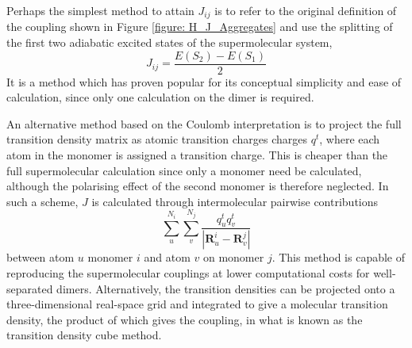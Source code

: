 Perhaps the simplest method to attain $J_{ij}$ is to refer to the original definition of the coupling shown in Figure \ref{figure: H_J_Aggregates} and use the splitting of the first two adiabatic excited states of the supermolecular system,
\begin{equation}
    J_{ij}=\frac{E(S_{2})-E(S_{1})}{2}
\end{equation}
It is a method which has proven popular for its conceptual simplicity and ease of calculation, since only one calculation on the dimer is required.\cite{Hsu2009,Gierschner2013a,Shi2017}

An alternative method based on the Coulomb interpretation is to project the full transition density matrix as atomic transition charges charges $q^{t}$, where each atom in the monomer is assigned a transition charge. This is cheaper than the full supermolecular calculation since only a monomer need be calculated, although the polarising effect of the second monomer is therefore neglected. In such a scheme, $J$ is calculated through intermolecular pairwise contributions
\begin{equation}\label{equation: J_TC}
\sum_{u}^{N_{i}}\sum_{v}^{N_{j}}\frac{q^{t}_{u}q^{t}_{v}}{|\bm{R}_{u}^{i}-\bm{R}_{v}^{j}|}
\end{equation}
between atom $u$ monomer $i$ and atom $v$ on monomer $j$. This method is capable of reproducing the supermolecular couplings at lower computational costs for well-separated dimers.\cite{Kistler2013} Alternatively, the transition densities can be projected onto a three-dimensional real-space grid and integrated to give a molecular transition density, the product of which gives the coupling, in what is known as the transition density cube method.\cite{Bricker2014}

